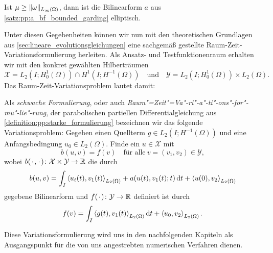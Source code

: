 \begin{Korollar}
\label{korollar:cha3:bf_elliptisch}
    Ist $\mu \geq \lVert\omega\rVert_{L_{\infty}(\Omega)}$, dann ist die Bilinearform $a$ aus \cref{satz:pp:a_bf_bounded_garding} elliptisch.
\end{Korollar}

Unter diesen Gegebenheiten können wir nun mit den theoretischen Grundlagen aus \cref{sec:lineare_evolutionsgleichungen} eine sachgemäß gestellte Raum-Zeit-Variationsformulierung herleiten.
Als Ansatz- und Testfunktionenraum erhalten wir mit den konkret gewählten Hilberträumen
\begin{equation}
    \label{eq:var_ansatzraum_testraum}
    \mathcal X = L_{2}(I; H^{1}_{0}(\Omega)) \cap H^{1}(I; H^{-1}(\Omega))
    \quad \text{und} \quad
    \mathcal Y = L_{2}(I; H^{1}_{0}(\Omega)) \times L_{2}(\Omega).
\end{equation}
Das Raum-Zeit-Variationsproblem lautet damit:
\begin{Definition}
\label{definition:cha3:schwache_formulierung}
    Als \emph{schwache Formulierung}, oder auch \emph{Raum"=Zeit"=Va"-ri"-a"-ti"-ons"-for"-mu"-lie"-rung}, der parabolischen partiellen Differentialgleichung aus \cref{definition:pp:starke_formulierung} bezeichnen wir das folgende Variationsproblem:
    Gegeben einen Quellterm $g \in L_{2}(I; H^{-1}(\Omega))$ und eine Anfangsbedingung $u_{0} \in L_{2}(\Omega)$.
    Finde ein $u \in \mathcal X$ mit
    \begin{equation}
        \label{eq:varprob}
        b(u, v) = f(v) \quad \text{für alle}~v = (v_{1}, v_{2}) \in \mathcal Y,
    \end{equation}
    wobei $b({\mkern2mu\cdot\mkern2mu}, {\mkern2mu\cdot\mkern2mu}) \colon \mathcal X \times \mathcal Y \to \mathbb{R}$ die durch
    \begin{equation}
        \label{eq:buv}
        b(u, v)
            = \int_{I} \left\langle u_{t}(t),v_{1}(t)\right\rangle_{L_{2}(\Omega)} + a(u(t), v_{1}(t); t) \mathop{}\!\mathrm{d} t + \left\langle u(0),v_{2}\right\rangle_{L_{2}(\Omega)}
    \end{equation}
    gegebene Bilinearform und $f({\mkern2mu\cdot\mkern2mu}) \colon \mathcal Y \to \mathbb{R}$ definiert ist durch
    \begin{equation}
        \label{eq:var_all_f_wiederholung}
        f(v) = \int_{I} \left\langle g(t),v_{1}(t)\right\rangle_{L_{2}(\Omega)} \mathop{}\!\mathrm{d} t + \left\langle u_{0},v_{2}\right\rangle_{L_{2}(\Omega)}.
    \end{equation}
\end{Definition}

Diese Variationsformulierung wird uns in den nachfolgenden Kapiteln als Ausgangspunkt für die von uns angestrebten numerischen Verfahren dienen.

